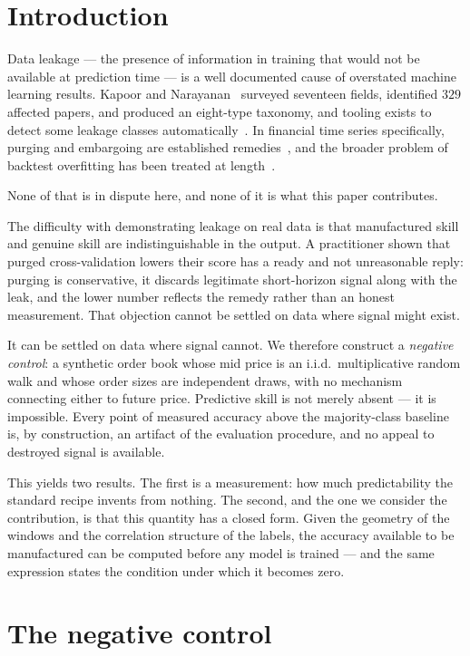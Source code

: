 \documentclass[11pt,a4paper]{article}
\begin{document}
\section{Introduction}

Data leakage --- the presence of information in training that would not be
available at prediction time --- is a well documented cause of overstated
machine learning results. Kapoor and Narayanan~\cite{kapoor2023} surveyed
seventeen fields, identified $329$ affected papers, and produced an eight-type
taxonomy, and tooling exists to detect some leakage classes
automatically~\cite{talagala2024}. In financial time series specifically, purging and embargoing are
established remedies~\cite{lopezdeprado2018}, and the broader problem of
backtest overfitting has been treated at length~\cite{bailey2014}.

None of that is in dispute here, and none of it is what this paper contributes.

The difficulty with demonstrating leakage on real data is that manufactured
skill and genuine skill are indistinguishable in the output. A practitioner
shown that purged cross-validation lowers their score has a ready and not
unreasonable reply: purging is conservative, it discards legitimate
short-horizon signal along with the leak, and the lower number reflects the
remedy rather than an honest measurement. That objection cannot be settled on
data where signal might exist.

It can be settled on data where signal cannot. We therefore construct a
\emph{negative control}: a synthetic order book whose mid price is an
i.i.d.\ multiplicative random walk and whose order sizes are independent draws,
with no mechanism connecting either to future price. Predictive skill is not
merely absent --- it is impossible. Every point of measured accuracy above the
majority-class baseline is, by construction, an artifact of the evaluation
procedure, and no appeal to destroyed signal is available.

This yields two results. The first is a measurement: how much predictability the
standard recipe invents from nothing. The second, and the one we consider the
contribution, is that this quantity has a closed form. Given the geometry of the
windows and the correlation structure of the labels, the accuracy available to
be manufactured can be computed before any model is trained --- and the same
expression states the condition under which it becomes zero.

\section{The negative control}
\end{document}
